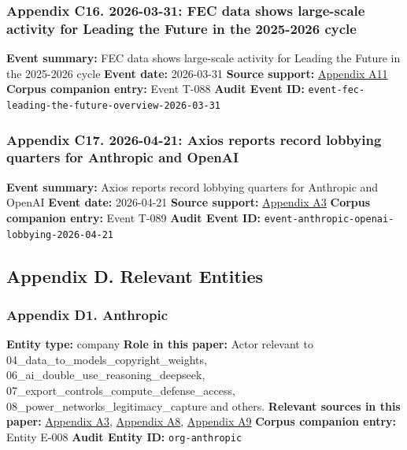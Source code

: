 \documentclass[
  american,
  11pt,
  letterpaper,
]{article}
\begin{document}
\subsubsection{Appendix C16. 2026-03-31: FEC data shows large-scale
activity for Leading the Future in the 2025-2026
cycle}\label{appendix-c16-2026-03-31-fec-data-shows-large-scale-activity-for-leading-the-future-in-the-2025-2026-cycle}

\textbf{Event summary:} FEC data shows large-scale activity for Leading
the Future in the 2025-2026 cycle \textbf{Event date:} 2026-03-31
\textbf{Source support:}
\hyperref[appendix-a11-leading-the-future-committee-overview]{Appendix
A11} \textbf{Corpus companion entry:} Event T-088 \textbf{Audit Event
ID:} \texttt{event-fec-leading-the-future-overview-2026-03-31}

\subsubsection{Appendix C17. 2026-04-21: Axios reports record lobbying
quarters for Anthropic and
OpenAI}\label{appendix-c17-2026-04-21-axios-reports-record-lobbying-quarters-for-anthropic-and-openai}

\textbf{Event summary:} Axios reports record lobbying quarters for
Anthropic and OpenAI \textbf{Event date:} 2026-04-21 \textbf{Source
support:}
\hyperref[appendix-a3-anthropic-outspends-openai-in-biggest-ever-lobbying-quarter]{Appendix
A3} \textbf{Corpus companion entry:} Event T-089 \textbf{Audit Event
ID:} \texttt{event-anthropic-openai-lobbying-2026-04-21}

\subsection{Appendix D. Relevant
Entities}\label{appendix-d.-relevant-entities}

\subsubsection{Appendix D1. Anthropic}\label{appendix-d1-anthropic}

\textbf{Entity type:} company \textbf{Role in this paper:} Actor
relevant to 04\_data\_to\_models\_copyright\_weights,
06\_ai\_double\_use\_reasoning\_deepseek,
07\_export\_controls\_compute\_defense\_access,
08\_power\_networks\_legitimacy\_capture and others. \textbf{Relevant
sources in this paper:}
\hyperref[appendix-a3-anthropic-outspends-openai-in-biggest-ever-lobbying-quarter]{Appendix
A3},
\hyperref[appendix-a8-claude-gov-models-for-u-s-national-security-customers]{Appendix
A8},
\hyperref[appendix-a9-anthropic-and-palantir-partner-to-bring-claude-ai-models-to-aws-for-u-s-government-intelligence-and-defense-operations]{Appendix
A9} \textbf{Corpus companion entry:} Entity E-008 \textbf{Audit Entity
ID:} \texttt{org-anthropic}
\end{document}
